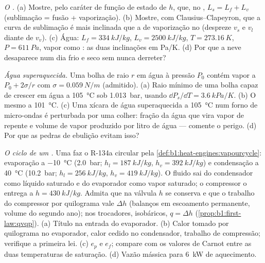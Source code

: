 \begin{exercise}[$\star\star\star$]\label{exo:b1:phase-changes:10}
\emph{O .} (a) Mostre, pelo caráter de função de estado de
$h$, que, no , $L_s = L_f + L_v$ (sublimação = fusão +
vaporização). (b) Mostre, com Clausius--Clapeyron, que a curva de
sublimação é mais inclinada que a de vaporização no 
(despreze $v_s$ e $v_l$ diante de $v_v$). (c) Água: $L_f = \qty{334}{kJ/kg}$,
$L_v = \qty{2500}{kJ/kg}$, $T = \qty{273.16}{K}$, $P = \qty{611}{Pa}$, vapor como
: as duas inclinações em \unit{Pa/K}. (d) Por que a neve desaparece
num dia frio e seco sem nunca derreter?
\end{exercise}

\begin{exercise}[$\star\star\star$]\label{exo:b1:phase-changes:11}
\emph{Água superaquecida.} Uma bolha de raio $r$ em água à pressão
$P_0$ contém vapor a $P_0 + 2\sigma/r$ com $\sigma = \qty{0.059}{N/m}$
(admitido). (a) Raio mínimo de uma bolha capaz de crescer em água a
\qty{105}{\degreeCelsius} sob \qty{1.013}{bar}, usando
$\dd P_s/\dd T = \qty{3.6}{kPa/K}$. (b) O mesmo a \qty{101}{\degreeCelsius}.
(c) Uma xícara de água superaquecida a \qty{105}{\degreeCelsius} num forno de
micro-ondas é perturbada por uma colher: fração da água que vira vapor de
repente e volume de vapor produzido por litro de água --- comente
o perigo. (d) Por que as pedras de ebulição evitam isso?
\end{exercise}

\begin{exercise}[$\star\star\star$]\label{exo:b1:phase-changes:12}
\emph{O ciclo de um .} Uma  faz o R-134a
circular pela \cref{def:b1:heat-engines:vapourcycle}: evaporação a
\qty{-10}{\degreeCelsius} (\qty{2.0}{bar}; $h_l = \qty{187}{kJ/kg}$, $h_v =
\qty{392}{kJ/kg}$) e condensação a \qty{40}{\degreeCelsius} (\qty{10.2}{bar};
$h_l = \qty{256}{kJ/kg}$, $h_v = \qty{419}{kJ/kg}$). O fluido sai do
condensador como líquido saturado e do evaporador como vapor saturado;
o compressor o entrega a $h = \qty{430}{kJ/kg}$. Admita que na
válvula $h$ se conserva e que o trabalho do compressor por quilograma vale
$\Delta h$ (balanços em escoamento permanente, volume do segundo ano); nos trocadores,
isobáricos, $q = \Delta h$ (\cref{prop:b1:first-law:qvqp}). (a) Título
na entrada do evaporador. (b) Calor tomado por quilograma no evaporador,
calor cedido no condensador, trabalho de compressão; verifique a primeira lei.
(c) $e_p$ e $e_f$; compare com os valores de Carnot entre as duas
temperaturas de saturação. (d) Vazão mássica para \qty{6}{kW} de aquecimento.
\end{exercise}

